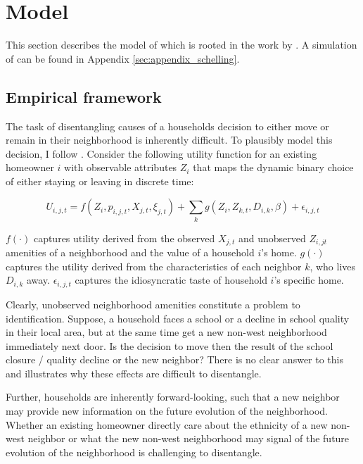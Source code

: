 \documentclass[../main.tex]{subfiles}
\begin{document}
\section{Model}
\label{sec:model}
This section describes the model of \textcite{Bayer_2022_nearest_neighbor} which is rooted in the work by \textcite{schelling1971dynamic}. A simulation of \textcite{schelling1971dynamic} can be found in Appendix \ref{sec:appendix_schelling}.

\subsection{Empirical framework}
The task of disentangling causes of a households decision to either move or remain in their neighborhood is inherently difficult. To plausibly model this decision, I follow \textcite{Bayer_2022_nearest_neighbor}. Consider the following utility function for an existing homeowner $i$ with observable attributes $Z_i$ that maps the dynamic binary choice of either staying or leaving in discrete time:

\begin{equation}
    U_{i, j, t} = f(Z_i, p_{i, j, t}, X_{j, t}, \xi_{j,t }) + \sum_k g(Z_i, Z_{k, t}, D_{i, k}, \beta) + \epsilon_{i, j, t}
    \label{eq:utility_household_moving}
\end{equation}

$f(\cdot)$ captures utility derived from the observed $X_{j,t}$ and unobserved $Z_{i, jt}$ amenities of a neighborhood and the value of a household $i$'s home. $g(\cdot)$ captures the utility derived from the characteristics of each neighbor $k$, who lives $D_{i, k}$ away. $\epsilon_{i, j, t}$ captures the idiosyncratic taste of household $i$'s specific home. 

Clearly, unobserved neighborhood amenities constitute a problem to identification. Suppose, a household faces a school or a decline in school quality in their local area, but at the same time get a new non-west neighborhood immediately next door. Is the decision to move then the result of the school closure / quality decline or the new neighbor? There is no clear answer to this and illustrates why these effects are difficult to disentangle.

Further, households are inherently forward-looking, such that a new neighbor may provide new information on the future evolution of the neighborhood. Whether an existing homeowner directly care about the ethnicity of a new non-west neighbor or what the new non-west neighborhood may signal of the future evolution of the neighborhood is challenging to disentangle. 
\end{document}
